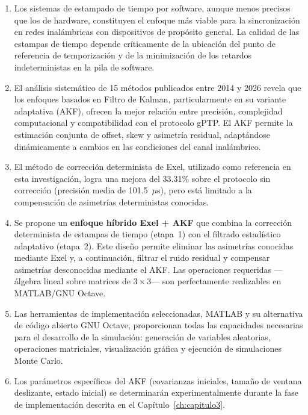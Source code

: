 \begin{enumerate}
\item Los sistemas de estampado de tiempo por software, aunque menos precisos que los de hardware, constituyen el enfoque más viable para la sincronización en redes inalámbricas con dispositivos de propósito general. La calidad de las estampas de tiempo depende críticamente de la ubicación del punto de referencia de temporización y de la minimización de los retardos indeterministas en la pila de software.

\item El análisis sistemático de 15 métodos publicados entre 2014 y 2026 revela que los enfoques basados en Filtro de Kalman, particularmente en su variante adaptativa (AKF), ofrecen la mejor relación entre precisión, complejidad computacional y compatibilidad con el protocolo gPTP. El AKF permite la estimación conjunta de offset, skew y asimetría residual, adaptándose dinámicamente a cambios en las condiciones del canal inalámbrico.

\item El método de corrección determinista de Exel, utilizado como referencia en esta investigación, logra una mejora del 33.31\% sobre el protocolo sin corrección (precisión media de 101.5~$\mu$s), pero está limitado a la compensación de asimetrías deterministas conocidas.

\item Se propone un \textbf{enfoque híbrido Exel + AKF} que combina la corrección determinista de estampas de tiempo (etapa~1) con el filtrado estadístico adaptativo (etapa~2). Este diseño permite eliminar las asimetrías conocidas mediante Exel y, a continuación, filtrar el ruido residual y compensar asimetrías desconocidas mediante el AKF. Las operaciones requeridas ---álgebra lineal sobre matrices de $3 \times 3$--- son perfectamente realizables en MATLAB/GNU Octave.

\item Las herramientas de implementación seleccionadas, MATLAB y su alternativa de código abierto GNU Octave, proporcionan todas las capacidades necesarias para el desarrollo de la simulación: generación de variables aleatorias, operaciones matriciales, visualización gráfica y ejecución de simulaciones Monte Carlo.

\item Los parámetros específicos del AKF (covarianzas iniciales, tamaño de ventana deslizante, estado inicial) se determinarán experimentalmente durante la fase de implementación descrita en el Capítulo~\ref{ch:capitulo3}.
\end{enumerate}
